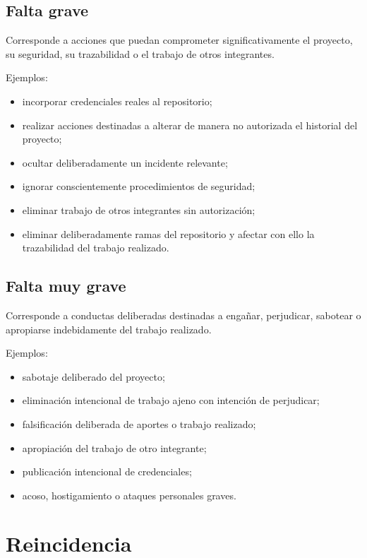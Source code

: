 \documentclass[12pt,a4paper]{article}
\begin{document}
\subsection{Falta grave}

Corresponde a acciones que puedan comprometer significativamente el proyecto, su seguridad, su trazabilidad o el trabajo de otros integrantes.

Ejemplos:

\begin{itemize}
    \item incorporar credenciales reales al repositorio;
    \item realizar acciones destinadas a alterar de manera no autorizada el historial del proyecto;
    \item ocultar deliberadamente un incidente relevante;
    \item ignorar conscientemente procedimientos de seguridad;
    \item eliminar trabajo de otros integrantes sin autorización;
    \item eliminar deliberadamente ramas del repositorio y afectar con ello la trazabilidad del trabajo realizado.
\end{itemize}

\subsection{Falta muy grave}

Corresponde a conductas deliberadas destinadas a engañar, perjudicar, sabotear o apropiarse indebidamente del trabajo realizado.

Ejemplos:

\begin{itemize}
    \item sabotaje deliberado del proyecto;
    \item eliminación intencional de trabajo ajeno con intención de perjudicar;
    \item falsificación deliberada de aportes o trabajo realizado;
    \item apropiación del trabajo de otro integrante;
    \item publicación intencional de credenciales;
    \item acoso, hostigamiento o ataques personales graves.
\end{itemize}

\section{Reincidencia}
\end{document}

